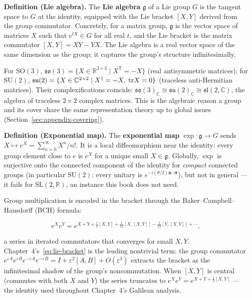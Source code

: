 \medskip\noindent\textbf{Definition (Lie algebra).} The \textbf{Lie algebra} $\mathfrak g$ of a Lie group $G$ is the tangent space to $G$ at the identity, equipped with the Lie bracket $[X,Y]$ derived from the group commutator. Concretely, for a matrix group, $\mathfrak g$ is the vector space of matrices $X$ such that $e^{tX}\in G$ for all real $t$, and the Lie bracket is the matrix commutator $[X,Y]=XY-YX$. The Lie algebra is a real vector space of the same dimension as the group; it captures the group's structure infinitesimally.

For $\mathrm{SO}(3)$, $\mathfrak{so}(3)=\{X\in\mathbb{R}^{3\times3}\mid X^{\mathsf T}=-X\}$ (real antisymmetric matrices); for $\mathrm{SU}(2)$, $\mathfrak{su}(2)=\{X\in\mathbb{C}^{2\times2}\mid X^{\dagger}=-X,\;\mathrm{tr} X=0\}$ (traceless anti-Hermitian matrices). Their complexifications coincide: $\mathfrak{so}(3)_{\mathbb C}\cong\mathfrak{su}(2)_{\mathbb C}\cong\mathfrak{sl}(2,\mathbb C)$, the algebra of traceless $2\times2$ complex matrices. This is the algebraic reason a group and its cover share the same representation theory up to global issues (Section~\ref{sec:appendix-covering}).

\medskip\noindent\textbf{Definition (Exponential map).} The \textbf{exponential map} $\exp:\mathfrak g\to G$ sends $X\mapsto e^{X}=\sum_{n=0}^{\infty}X^{n}/n!$. It is a local diffeomorphism near the identity: every group element close to $e$ is $e^{X}$ for a unique small $X\in\mathfrak g$. Globally, $\exp$ is surjective onto the connected component of the identity for \emph{compact} connected groups (in particular $\mathrm{SU}(2)$: every unitary is $e^{-i(\theta/2)\bm n\cdot\bm\sigma}$), but not in general --- it fails for $\mathrm{SL}(2,\mathbb R)$, an instance this book does not need.

Group multiplication is encoded in the bracket through the Baker--Campbell--Hausdorff (BCH) formula:
\begin{linenomath}
\begin{equation}
e^{X}e^{Y} = e^{X+Y+\frac{1}{2}[X,Y]+\frac{1}{12}[X,[X,Y]]-\frac{1}{12}[Y,[X,Y]]+\cdots},
\label{eq:bch-formula}
\end{equation}
\end{linenomath}
a series in iterated commutators that converges for small $X,Y$. Chapter~4's~\eqref{eq:lie-bracket} is the leading nontrivial term: the group commutator $e^{\varepsilon A}e^{\varepsilon B}e^{-\varepsilon A}e^{-\varepsilon B}=I+\varepsilon^{2}[A,B]+O(\varepsilon^{3})$ extracts the bracket as the infinitesimal shadow of the group's noncommutation. When $[X,Y]$ is central (commutes with both $X$ and $Y$) the series truncates to $e^{X}e^{Y}=e^{X+Y+\frac12[X,Y]}$ --- the identity used throughout Chapter~4's Galilean analysis.

